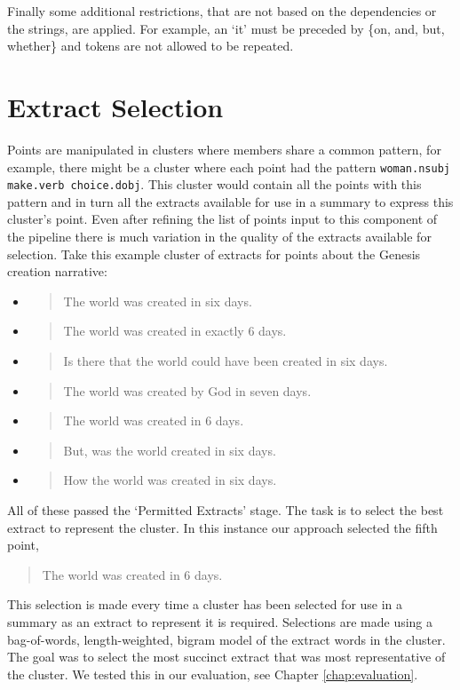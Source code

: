     Finally some additional restrictions, that are not based on the dependencies or the strings, are applied. For example, an `it' must be preceded by \{on, and, but, whether\} and tokens are not allowed to be repeated.

  \section{Extract Selection}
    Points are manipulated in clusters where members share a common pattern, for example, there might be a cluster where each point had the pattern \texttt{woman.nsubj make.verb choice.dobj}. This cluster would contain all the points with this pattern and in turn all the extracts available for use in a summary to express this cluster's point. Even after refining the list of points input to this component of the pipeline there is much variation in the quality of the extracts available for selection. Take this example cluster of extracts for points about the Genesis creation narrative:

    \begin{itemize}[label={}]
      \item{\blockquote{The world was created in six days.}}
      \item{\blockquote{The world was created in exactly 6 days.}}
      \item{\blockquote{Is there that the world could have been created in six days.}}
      \item{\blockquote{The world was created by God in seven days.}}
      \item{\blockquote{The world was created in 6 days.}}
      \item{\blockquote{But, was the world created in six days.}}
      \item{\blockquote{How the world was created in six days.}}
    \end{itemize}

    All of these passed the `Permitted Extracts' stage. The task is to select the best extract to represent the cluster. In this instance our approach selected the fifth point, \blockquote{The world was created in 6 days.}. This selection is made every time a cluster has been selected for use in a summary as an extract to represent it is required. Selections are made using a bag-of-words, length-weighted, bigram model of the extract words in the cluster. The goal was to select the most succinct extract that was most representative of the cluster. We tested this in our evaluation, see Chapter \ref{chap:evaluation}.

